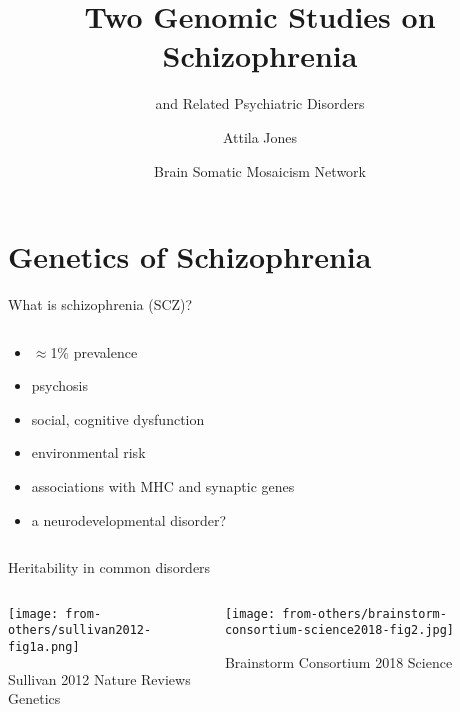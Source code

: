 \documentclass[usenames,dvipsnames]{beamer}
\title{Two Genomic Studies on Schizophrenia}
\subtitle{and Related Psychiatric Disorders}
\author{Attila Jones}
\date{Brain Somatic Mosaicism Network}
\begin{document}
\maketitle

\section{Genetics of Schizophrenia}

\begin{frame}{What is schizophrenia (SCZ)?}
\begin{columns}[t]
\begin{column}{0.55\textwidth}
	\begin{itemize}
		\item \(\approx\)1\% prevalence
                \item psychosis
                \item social, cognitive dysfunction
                \item environmental risk
		\item associations with MHC and synaptic genes
                \item a neurodevelopmental disorder?
	\end{itemize}
\end{column}

\begin{column}{0.45\textwidth}

\end{column}
\end{columns}
\end{frame}

\begin{frame}{Heritability in common disorders}
\begin{columns}[t]
\begin{column}{0.4\textwidth}

\texttt{[image: from-others/sullivan2012-fig1a.png]}

{\tiny Sullivan 2012 Nature Reviews Genetics}
\end{column}

\begin{column}{0.6\textwidth}

\texttt{[image: from-others/brainstorm-consortium-science2018-fig2.jpg]}

{\tiny Brainstorm Consortium 2018 Science}
\end{column}
\end{columns}
\end{frame}
\end{document}
